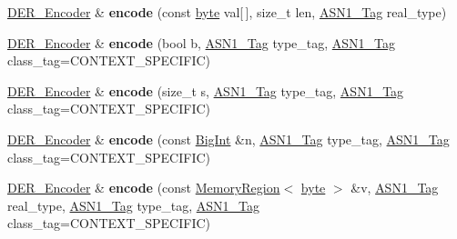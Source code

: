 \begin{DoxyCompactItemize}
\item 
\hypertarget{classBotan_1_1DER__Encoder_a154b1f3f8c8041fca9546b572f29a767}{\hyperlink{classBotan_1_1DER__Encoder}{D\-E\-R\-\_\-\-Encoder} \& {\bfseries encode} (const \hyperlink{namespaceBotan_a7d793989d801281df48c6b19616b8b84}{byte} val\mbox{[}$\,$\mbox{]}, size\-\_\-t len, \hyperlink{namespaceBotan_aaa08f67a945ef195fa39e62659dffa7a}{A\-S\-N1\-\_\-\-Tag} real\-\_\-type)}\label{classBotan_1_1DER__Encoder_a154b1f3f8c8041fca9546b572f29a767}

\item 
\hypertarget{classBotan_1_1DER__Encoder_aa99a6e2f87a1c2515d486cdc144ea3cf}{\hyperlink{classBotan_1_1DER__Encoder}{D\-E\-R\-\_\-\-Encoder} \& {\bfseries encode} (bool b, \hyperlink{namespaceBotan_aaa08f67a945ef195fa39e62659dffa7a}{A\-S\-N1\-\_\-\-Tag} type\-\_\-tag, \hyperlink{namespaceBotan_aaa08f67a945ef195fa39e62659dffa7a}{A\-S\-N1\-\_\-\-Tag} class\-\_\-tag=C\-O\-N\-T\-E\-X\-T\-\_\-\-S\-P\-E\-C\-I\-F\-I\-C)}\label{classBotan_1_1DER__Encoder_aa99a6e2f87a1c2515d486cdc144ea3cf}

\item 
\hypertarget{classBotan_1_1DER__Encoder_aaeea4e140e2fad08accff40696574e79}{\hyperlink{classBotan_1_1DER__Encoder}{D\-E\-R\-\_\-\-Encoder} \& {\bfseries encode} (size\-\_\-t s, \hyperlink{namespaceBotan_aaa08f67a945ef195fa39e62659dffa7a}{A\-S\-N1\-\_\-\-Tag} type\-\_\-tag, \hyperlink{namespaceBotan_aaa08f67a945ef195fa39e62659dffa7a}{A\-S\-N1\-\_\-\-Tag} class\-\_\-tag=C\-O\-N\-T\-E\-X\-T\-\_\-\-S\-P\-E\-C\-I\-F\-I\-C)}\label{classBotan_1_1DER__Encoder_aaeea4e140e2fad08accff40696574e79}

\item 
\hypertarget{classBotan_1_1DER__Encoder_a1b1c6317ec3e12eb6b72d98024dda8a1}{\hyperlink{classBotan_1_1DER__Encoder}{D\-E\-R\-\_\-\-Encoder} \& {\bfseries encode} (const \hyperlink{classBotan_1_1BigInt}{Big\-Int} \&n, \hyperlink{namespaceBotan_aaa08f67a945ef195fa39e62659dffa7a}{A\-S\-N1\-\_\-\-Tag} type\-\_\-tag, \hyperlink{namespaceBotan_aaa08f67a945ef195fa39e62659dffa7a}{A\-S\-N1\-\_\-\-Tag} class\-\_\-tag=C\-O\-N\-T\-E\-X\-T\-\_\-\-S\-P\-E\-C\-I\-F\-I\-C)}\label{classBotan_1_1DER__Encoder_a1b1c6317ec3e12eb6b72d98024dda8a1}

\item 
\hypertarget{classBotan_1_1DER__Encoder_ae780116530622d2c490aa74b301492a7}{\hyperlink{classBotan_1_1DER__Encoder}{D\-E\-R\-\_\-\-Encoder} \& {\bfseries encode} (const \hyperlink{classBotan_1_1MemoryRegion}{Memory\-Region}$<$ \hyperlink{namespaceBotan_a7d793989d801281df48c6b19616b8b84}{byte} $>$ \&v, \hyperlink{namespaceBotan_aaa08f67a945ef195fa39e62659dffa7a}{A\-S\-N1\-\_\-\-Tag} real\-\_\-type, \hyperlink{namespaceBotan_aaa08f67a945ef195fa39e62659dffa7a}{A\-S\-N1\-\_\-\-Tag} type\-\_\-tag, \hyperlink{namespaceBotan_aaa08f67a945ef195fa39e62659dffa7a}{A\-S\-N1\-\_\-\-Tag} class\-\_\-tag=C\-O\-N\-T\-E\-X\-T\-\_\-\-S\-P\-E\-C\-I\-F\-I\-C)}\label{classBotan_1_1DER__Encoder_ae780116530622d2c490aa74b301492a7}


\end{DoxyCompactItemize}

